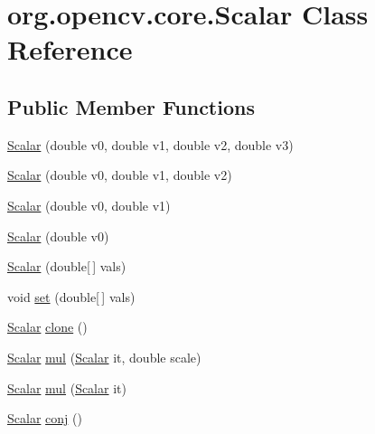\hypertarget{classorg_1_1opencv_1_1core_1_1_scalar}{}\section{org.\+opencv.\+core.\+Scalar Class Reference}
\label{classorg_1_1opencv_1_1core_1_1_scalar}
\subsection*{Public Member Functions}
\begin{DoxyCompactItemize}
\item 
\mbox{\hyperlink{classorg_1_1opencv_1_1core_1_1_scalar_a04b29c5652d074c999eaf60878ed859e}{Scalar}} (double v0, double v1, double v2, double v3)
\item 
\mbox{\hyperlink{classorg_1_1opencv_1_1core_1_1_scalar_ac7e4a16663084e22ce81338ed51b901d}{Scalar}} (double v0, double v1, double v2)
\item 
\mbox{\hyperlink{classorg_1_1opencv_1_1core_1_1_scalar_af0dc66669d16d1a30ed0b44981a25b69}{Scalar}} (double v0, double v1)
\item 
\mbox{\hyperlink{classorg_1_1opencv_1_1core_1_1_scalar_a5fdded9cf5c81f48e83edd85fde8d435}{Scalar}} (double v0)
\item 
\mbox{\hyperlink{classorg_1_1opencv_1_1core_1_1_scalar_a26051d6b5f968bc26ec4b1ce51885de3}{Scalar}} (double\mbox{[}$\,$\mbox{]} vals)
\item 
void \mbox{\hyperlink{classorg_1_1opencv_1_1core_1_1_scalar_a4ca58ccf95a87d6e7a7b7db3deb9f25b}{set}} (double\mbox{[}$\,$\mbox{]} vals)
\item 
\mbox{\hyperlink{classorg_1_1opencv_1_1core_1_1_scalar}{Scalar}} \mbox{\hyperlink{classorg_1_1opencv_1_1core_1_1_scalar_a4c3e3f4170f39b101790d5c47e6367b2}{clone}} ()
\item 
\mbox{\hyperlink{classorg_1_1opencv_1_1core_1_1_scalar}{Scalar}} \mbox{\hyperlink{classorg_1_1opencv_1_1core_1_1_scalar_a67dfcb24ec507020e3e4e9a77c683e2b}{mul}} (\mbox{\hyperlink{classorg_1_1opencv_1_1core_1_1_scalar}{Scalar}} it, double scale)
\item 
\mbox{\hyperlink{classorg_1_1opencv_1_1core_1_1_scalar}{Scalar}} \mbox{\hyperlink{classorg_1_1opencv_1_1core_1_1_scalar_aa667cb58f9591cdc47b2eff0ec429155}{mul}} (\mbox{\hyperlink{classorg_1_1opencv_1_1core_1_1_scalar}{Scalar}} it)
\item 
\mbox{\hyperlink{classorg_1_1opencv_1_1core_1_1_scalar}{Scalar}} \mbox{\hyperlink{classorg_1_1opencv_1_1core_1_1_scalar_a88324b97617f5300cb2eaccfe8cc1372}{conj}} ()

\end{DoxyCompactItemize}
